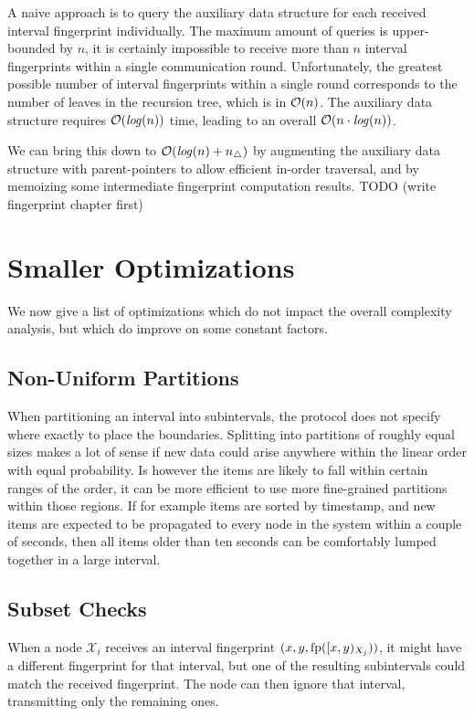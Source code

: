 A naive approach is to query the auxiliary data structure for each received interval fingerprint individually. The maximum amount of queries is upper-bounded by $n$, it is certainly impossible to receive more than $n$ interval fingerprints within a single communication round. Unfortunately, the greatest possible number of interval fingerprints within a single round corresponds to the number of leaves in the recursion tree, which is in $\mathcal{O}(n)$. The auxiliary data structure requires $\mathcal{O}(\mathit{log}(n))$ time, leading to an overall $\mathcal{O}(n \cdot \mathit{log}(n))$.

We can bring this down to $\mathcal{O}(\mathit{log}(n) + n_{\triangle})$ by augmenting the auxiliary data structure with parent-pointers to allow efficient in-order traversal, and by memoizing some intermediate fingerprint computation results. TODO (write fingerprint chapter first)

\section{Smaller Optimizations}
\label{set-reconciliation-simple-optimizations}

We now give a list of optimizations which do not impact the overall complexity analysis, but which do improve on some constant factors.

\subsection{Non-Uniform Partitions}

When partitioning an interval into subintervals, the protocol does not specify where exactly to place the boundaries. Splitting into partitions of roughly equal sizes makes a lot of sense if new data could arise anywhere within the linear order with equal probability. Is however the items are likely to fall within certain ranges of the order, it can be more efficient to use more fine-grained partitions within those regions. If for example items are sorted by timestamp, and new items are expected to be propagated to every node in the system within a couple of seconds, then all items older than ten seconds can be comfortably lumped together in a large interval.

\subsection{Subset Checks}

When a node $\mathcal{X}_i$ receives an interval fingerprint $({x}, {y}, {\operatorname{fp}([{x},{y})_{X_j})})$, it might have a different fingerprint for that interval, but one of the resulting subintervals could match the received fingerprint. The node can then ignore that interval, transmitting only the remaining ones.

